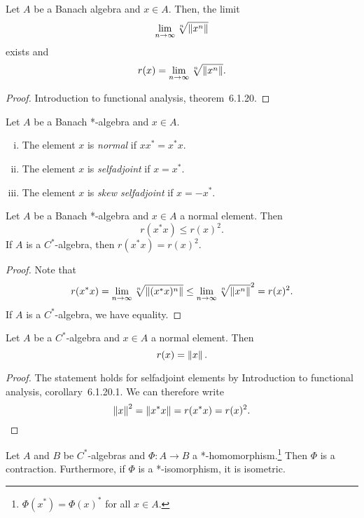 \begin{izrek}
Let $A$ be a Banach algebra and $x \in A$. Then, the limit
\[
\lim_{n \to \infty} \sqrt[n]{\left\lVert x^n\right\rVert}
\]
exists and
\[
r(x) = \lim_{n \to \infty} \sqrt[n]{\left\lVert x^n\right\rVert}.
\]
\end{izrek}

\begin{proof}
Introduction to functional analysis, theorem~6.1.20.
\end{proof}

\begin{definicija}
Let $A$ be a Banach *-algebra and $x \in A$.

\begin{enumerate}[i)]
\item The element $x$ is \emph{normal} if
$x x^* = x^* x$.
\item The element $x$ is \emph{selfadjoint} if
$x = x^*$.
\item The element $x$ is
\emph{skew selfadjoint} if $x = -x^*$.
\end{enumerate}
\end{definicija}

\begin{posledica}
Let $A$ be a Banach *-algebra and $x \in A$ a normal element. Then
\[
r(x^* x) \leq r(x)^2.
\]
If $A$ is a $C^*$-algebra, then $r(x^* x) = r(x)^2$.
\end{posledica}

\begin{proof}
Note that
\[
r(x^* x) =
\lim_{n \to \infty} \sqrt[n]{\left\lVert (x^* x)^n\right\rVert} \leq
\lim_{n \to \infty} \sqrt[n]{\left\lVert x^n\right\rVert}^2 = r(x)^2.
\]
If $A$ is a $C^*$-algebra, we have equality.
\end{proof}

\begin{trditev}
Let $A$ be a $C^*$-algebra and $x \in A$ a normal element. Then
\[
r(x) = \left\lVert x\right\rVert.
\]
\end{trditev}

\begin{proof}
The statement holds for selfadjoint elements by Introduction to
functional analysis, corollary~6.1.20.1. We can therefore write
\[
\left\lVert x\right\rVert^2 = \left\lVert x^* x\right\rVert = r(x^* x) = r(x)^2. \qedhere
\]
\end{proof}


\begin{posledica}
Let $A$ and $B$ be $C^*$-algebras and $\Phi \colon A \to B$ a
*-homomorphism.\footnote{$\Phi(x^*) = \Phi(x)^*$ for all
$x \in A$.} Then $\Phi$ is a contraction. Furthermore, if $\Phi$ is
a *-isomorphism, it is isometric.
\end{posledica}

